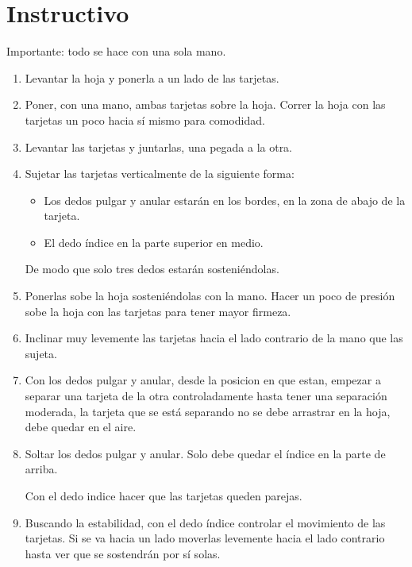 \documentclass{article}
\begin{document}
\section{Instructivo}
Importante: todo se hace con una sola mano.
\begin{enumerate}
    

\item Levantar la hoja y ponerla a un lado de las tarjetas. 

\item Poner, con una mano, ambas tarjetas sobre la hoja. Correr la hoja con las tarjetas un poco hacia sí mismo para comodidad. 

\item Levantar las tarjetas y juntarlas, una pegada a la otra.

\item Sujetar las tarjetas verticalmente de la siguiente forma:

\begin{itemize}
\item Los dedos pulgar y anular estarán en los bordes, en la zona de abajo de la tarjeta. 
\item El dedo índice en la parte superior en medio.
\end{itemize}
De modo que solo tres dedos estarán sosteniéndolas. 

\item Ponerlas sobe la hoja sosteniéndolas con la mano. Hacer un poco de presión sobe la hoja con las tarjetas para tener mayor firmeza.

\item Inclinar muy levemente las tarjetas hacia el lado contrario de la mano que las sujeta.  

\item Con los dedos pulgar y anular, desde la posicion en que estan, empezar a separar una tarjeta de la otra controladamente hasta tener una separación moderada, la tarjeta que se está separando no se debe arrastrar en la hoja, debe quedar en el aire. 



\item Soltar los dedos pulgar y anular. Solo debe quedar el índice en la parte de arriba.

Con el dedo indice hacer que las tarjetas queden parejas. 

\item Buscando la estabilidad, con el dedo índice controlar el movimiento de las tarjetas. Si se va hacia un lado moverlas levemente hacia el lado contrario hasta ver que se sostendrán por sí solas. 

\end{enumerate}
\end{document}
